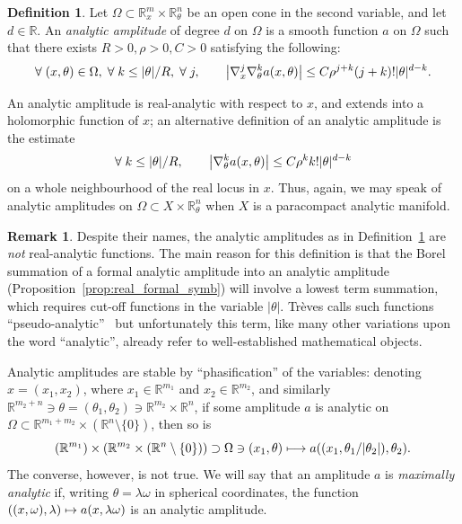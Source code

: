 \documentclass[10pt]{amsart}
\theoremstyle{definition}\newtheorem{defi}[theo]{Definition}\newtheorem{rema}[theo]{Remark}\newtheorem{exam}[theo]{Example}\newtheorem{exem}[theo]{Example}\newtheorem{nota}[theo]{Notation}
\newcommand\1{\mathds{1}}
\newcommand{\R}{\mathbb{R}}
\let\oldforall\forall
\renewcommand*{\forall}{\mathrel{\oldforall}}
\let\oldmapsto\mapsto
\renewcommand*{\mapsto}{\mathchoice{\longmapsto}{\oldmapsto}{\oldmapsto}{\oldmapsto}}
\let\originalleft\left
\let\originalright\right
\renewcommand{\left}{\mathopen{}\mathclose\bgroup\originalleft}
\renewcommand{\right}{\aftergroup\egroup\originalright}
\begin{document}
\begin{defi}\label{def:analytic_amp}
Let $\Omega\subset \R^m_x\times \R^n_{\theta}$ be an open cone in the second variable, and let $d\in \R$. An \emph{analytic amplitude} of degree $d$ on $\Omega$ is a smooth function $a$ on $\Omega$ such that there exists $R>0,\rho>0,C>0$ satisfying the following:
\[
\forall (x,\theta)\in \Omega,\;\forall k\leq |\theta|/R,\;\forall j,\qquad \left|\nabla_{x}^j\nabla_{\theta}^ka(x,\theta)\right|\leq C\rho^{j+k}(j+k)!|\theta|^{d-k}.
\]
\end{defi}

An analytic amplitude is real-analytic with respect to $x$, and extends into a holomorphic function of $x$; an alternative definition of an analytic amplitude is the estimate
\[
\forall k \leq |\theta|/R,\qquad \left|\nabla_{\theta}^ka(x,\theta)\right|\leq C\rho^kk!|\theta|^{d-k}
\]
on a whole neighbourhood of the real locus in $x$. Thus, again, we may speak of analytic amplitudes on $\Omega\subset X\times \R^n_{\theta}$ when $X$ is a paracompact analytic manifold.

\begin{rema}\label{rem:name_analytic_ampl}
Despite their names, the analytic amplitudes as in Definition~\ref{def:analytic_amp} are \emph{not} real-analytic functions. The main reason for this definition is that the Borel summation of a formal analytic amplitude into an analytic amplitude (Proposition~\ref{prop:real_formal_symb}) will involve a lowest term summation, which requires cut-off functions in the variable $|\theta|$. Trèves calls such functions ``pseudo-analytic''~\cite{treves_analytic_2022} but unfortunately this term, like many other variations upon the word ``analytic'', already refer to well-established mathematical objects.
\end{rema}

Analytic amplitudes are stable by ``phasification'' of the variables: denoting $x=(x_1,x_2)$, where $x_1\in \R^{m_1}$ and $x_2\in \R^{m_2}$, and similarly $\R^{m_2+n}\ni \theta=(\theta_1,\theta_2)\ni \R^{m_2}\times \R^n$, if some amplitude $a$ is analytic on $\Omega\subset \R^{m_1+m_2}\times (\R^{n}\setminus \{0\})$, then so is
\[
(\R^{m_1})\times (\R^{m_2}\times (\R^n\setminus \{0\}))\supset
\Omega \ni (x_1,\theta)\mapsto a((x_1,\theta_1/|\theta_2|),\theta_2).
\]
The converse, however, is not true. We will say that an amplitude $a$ is \emph{maximally analytic} if, writing $\theta=\lambda\omega$ in spherical coordinates, the function $((x,\omega),\lambda)\mapsto a(x,\lambda\omega)$ is an analytic amplitude.
\end{document}
